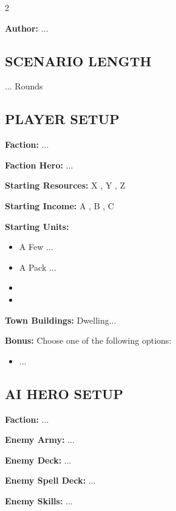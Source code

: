 
\begin{multicols*}{2}

\textbf{Author:} ...

\subsection*{\MakeUppercase{Scenario Length}}

... Rounds

\subsection*{\MakeUppercase{Player Setup}}

\textbf{Faction:} ...

\textbf{Faction Hero:} ...

\textbf{Starting Resources:} X , Y , Z 

\textbf{Starting Income:} A , B , C 

\textbf{Starting Units:}
\begin{itemize}
  \item A Few ...
  \item A Pack ...
  \item {}
  \item {}
\end{itemize}

\textbf{Town Buildings:}  Dwelling...

\textbf{Bonus:} Choose one of the following options:
\begin{itemize}
    \item ...
\end{itemize}

\subsection*{\MakeUppercase{AI Hero Setup}}

\textbf{Faction:} ...

\textbf{Enemy Army:} ...

\textbf{Enemy Deck:} ...

\textbf{Enemy Spell Deck:} ...

\textbf{Enemy Skills:} ...


\end{multicols*}
